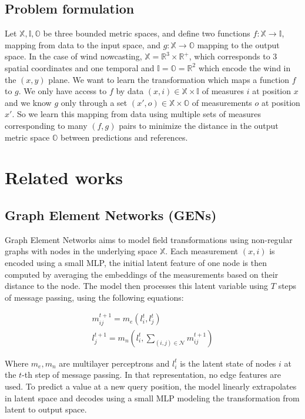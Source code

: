 \documentclass[a4paper,10pt]{article}
\begin{document}
\subsection{Problem formulation}

Let $\mathbb{X}, \mathbb{I}, \mathbb{O}$ be three bounded metric spaces, and define two functions $f : \mathbb{X}\rightarrow \mathbb{I}$, mapping from data to the input space, and $g : \mathbb{X}\rightarrow \mathbb{O}$ mapping to the output space.
In the case of wind nowcasting, $\mathbb{X} = \mathbb{R}^{3} \times \mathbb{R}^{+}$, which corresponds to 3 spatial coordinates and one temporal and $\mathbb{I} = \mathbb{O} = \mathbb{R}^{2}$ which encode the wind in the $(x,y)$ plane.
We want to learn the transformation which maps a function $f$ to $g$.
We only have access to $f$ by data $(x, i)  \in \mathbb{X} \times \mathbb{I}$ of measures $i$ at position $x$ and we know $g$ only through a set $(x', o) \in \mathbb{X} \times \mathbb{O}$ of measurements $o$ at position $x'$.
So we learn this mapping from data using multiple sets of measures corresponding to many $(f,g)$ pairs to minimize the distance in the output metric space $\mathbb{O}$ between predictions and references.

\section{Related works}

\subsection{Graph Element Networks (GENs)} \label{ssec:gen}
Graph Element Networks \cite{alet2019gen} aims to model field transformations using non-regular graphs with nodes in the underlying space $\mathbb{X}$. Each measurement $(x, i)$ is encoded using a small MLP, the initial latent feature of one node is then computed by averaging the embeddings of the measurements based on their distance to the node. The model then processes this latent variable using $T$ steps of message passing, using the following equations:

\begin{align}
  m_{ij}^{t + 1} = m_e(l_{i}^{t}, l_{j}^{t}) \\
  l_{j}^{t + 1} = m_{n}(l_{i}^{t}, \sum_{(i,j) \in \mathcal{N}} m_{ij}^{t + 1})
\end{align}

Where $m_e, m_n$ are multilayer perceptrons and $l_{i}^{t}$ is the latent state of nodes $i$ at the $t$-th step of message passing. In that representation, no edge features are used.
To predict a value at a new query position, the model linearly extrapolates in latent space and decodes using a small MLP modeling the transformation from latent to output space.
\end{document}
